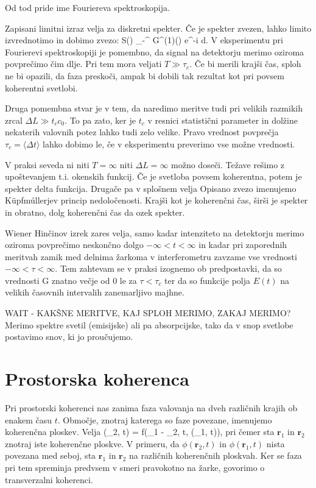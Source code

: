 Od tod pride ime Fouriereva spektroskopija. 

Zapisani limitni izraz velja za diskretni spekter. Če je spekter zvezen, lahko limito izvrednotimo in dobimo
zvezo:
\beq
S(\omega) \propto \int_{-\infty}^{\infty} G^{(1)}(\tau) e^{-i\omega \tau} d\tau.
\eeq
V eksperimentu pri Fourierevi spektroskopiji je pomembno, da signal na detektorju merimo oziroma
povprečimo čim dlje. Pri tem mora veljati $T \gg \tau_c$. Če bi merili krajši čas, sploh ne bi opazili, da
faza preskoči, ampak bi dobili tak rezultat kot pri povsem koherentni svetlobi. 

Druga pomembna stvar je v tem, da naredimo meritve tudi pri velikih razmikih zrcal $\Delta L \gg t_cc_0$. 
To pa zato, ker je $t_c$ v resnici statistični parameter in dolžine nekaterih 
valovnih potez lahko tudi 
zelo velike. Pravo vrednost povprečja $\tau_c = \langle \Delta t\rangle$ lahko dobimo le, če v eksperimentu
preverimo vse možne vrednosti. 

V praksi seveda ni niti $T= \infty$ niti $\Delta L = \infty$ možno doseči. Težave rešimo z upoštevanjem
t.i. okenskih funkcij. 
Če je svetloba povsem koherentna, potem je spekter delta funkcija. Drugače pa v splošnem velja
Opisano zvezo imenujemo K\"upfm\'ullerjev princip nedoločenosti. Krajši kot je koherenčni čas, širši je 
spekter in obratno, dolg koherenčni čas da ozek spekter.

Wiener Hinčinov izrek zares velja, samo kadar intenziteto na detektorju merimo oziroma povprečimo
neskončno dolgo $-\infty < t <\infty$ 
in kadar pri zaporednih meritvah zamik med delnima žarkoma v interferometru zavzame
vse vrednosti $-\infty <\tau <\infty$. Tem zahtevam se v praksi izognemo ob predpostavki, da so 
vrednosti G znatno večje od 0 le za $\tau <\tau_c$ ter da so funkcije polja $E(t)$ na velikih
časovnih intervalih zanemarljivo majhne.


WAIT - KAKŠNE MERITVE, KAJ SPLOH MERIMO, ZAKAJ MERIMO? Merimo spektre svetil (emisijske) ali pa 
absorpcijske, tako da v snop svetlobe postavimo snov, ki jo proučujemo. 


\section{Prostorska koherenca}
Pri prostorski koherenci nas zanima faza valovanja na dveh različnih krajih ob enakem času $t$. Območje, 
znotraj katerega so faze povezane, imenujemo koherenčna ploskev. Velja
\beq
\phi (_2, t) = f(_1 - _2, t, \phi(_1, t)),
\eeq
pri čemer sta $\mathbf{r}_1$ in $\mathbf{r}_2$ znotraj iste koherenčne ploskve.  V primeru, da
$\phi (\mathbf{r}_2, t)$ in $\phi (\mathbf{r}_1,t)$ nista povezana med seboj, sta $\mathbf{r}_1$
in $\mathbf{r}_2$ na različnih koherenčnih ploskvah. Ker se faza pri tem spreminja predvsem 
v smeri pravokotno na žarke, govorimo o transverzalni koherenci.

